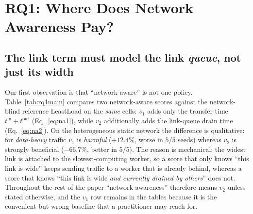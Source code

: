 \section{RQ1: Where Does Network Awareness Pay?}
\label{sec:rq1}

\subsection{The link term must model the link \emph{queue}, not just its width}
Our first observation is that ``network-aware'' is not one policy. Table~\ref{tab:rq1main}
compares two network-aware scores against the network-blind reference LeastLoad on the
\emph{same} cells: $v_1$ adds only the transfer time $t^{\text{in}}+t^{\text{out}}$
(Eq.~\ref{eq:na1}), while $v_2$ additionally adds the link-queue drain time
(Eq.~\ref{eq:na2}). On the heterogeneous static network the difference is qualitative: for
\emph{data-heavy} traffic $v_1$ is \emph{harmful} ($+12.4\%$, worse in $5/5$ seeds) whereas
$v_2$ is strongly beneficial ($-66.7\%$, better in $5/5$). The reason is mechanical: the widest
link is attached to the slowest-computing worker, so a score that only knows ``this link is wide''
keeps sending traffic to a worker that is already behind, whereas a score that knows ``this link
is wide \emph{and currently drained by others}'' does not. Throughout the rest of the paper
``network awareness'' therefore means $v_2$ unless stated otherwise, and the $v_1$ row remains in
the tables because it is the convenient-but-wrong baseline that a practitioner may reach for.

